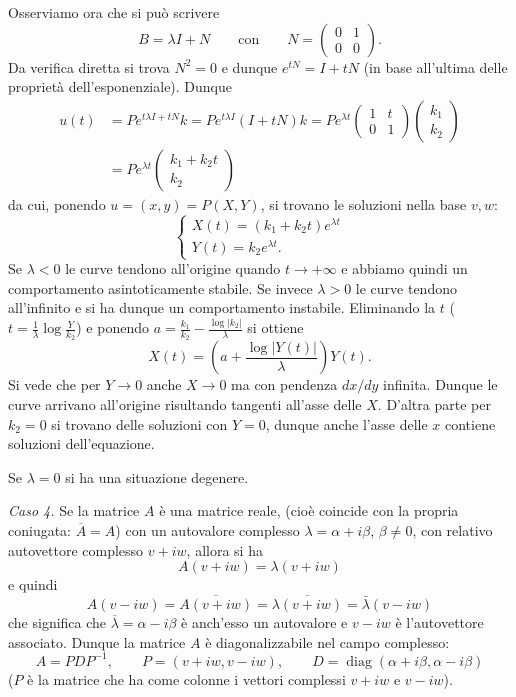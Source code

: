 \documentclass[italian,a4paper]{scrartcl}
\DeclareMathOperator{\diag}{diag}
\begin{document}
Osserviamo ora che si può scrivere
\[
B = \lambda I + N \qquad\text{con}\qquad N=\begin{pmatrix}0&1\\0 & 0\end{pmatrix}.
\]
Da verifica diretta si trova $N^2=0$ e dunque $e^{tN} = I + tN$ (in base
all'ultima delle proprietà dell'esponenziale). Dunque
\begin{align*}
u(t) &= P e^{t\lambda I + tN}k = P e^{t\lambda I} (I + t N)k =
P e^{\lambda t} \begin{pmatrix} 1 & t \\ 0 & 1\end{pmatrix}\begin{pmatrix}k_1\\k_2\end{pmatrix}\\
& = P e^{\lambda t}\begin{pmatrix}k_1 + k_2 t \\ k_2\end{pmatrix}
\end{align*}
da cui, ponendo $u=(x,y) = P(X,Y)$, si trovano le soluzioni nella base
$v,w$:
\[
\begin{cases}
X(t) = (k_1 + k_2 t) e^{\lambda t}\\
Y(t) = k_2 e^{\lambda t}.
\end{cases}
\]
Se $\lambda<0$ le curve tendono all'origine quando $t\to +\infty$ e
abbiamo quindi un comportamento asintoticamente stabile. Se invece
$\lambda>0$ le curve tendono all'infinito e si ha dunque un
comportamento instabile.
Eliminando la $t$ ($t=\frac 1 \lambda \log\frac Y {k_2}$) e ponendo $a
= \frac{k_1}{k_2} - \frac{\log|k_2|}{\lambda}$ si ottiene
\[
X(t) = \left(a+\frac{\log|Y(t)|}{\lambda}\right)Y(t).
\]
Si vede che per $Y\to 0$ anche $X\to 0$ ma con pendenza $dx/dy$
infinita. Dunque le curve arrivano all'origine risultando tangenti
all'asse delle $X$. D'altra parte per $k_2=0$ si trovano delle
soluzioni con $Y=0$, dunque anche l'asse delle $x$ contiene soluzioni
dell'equazione.

Se $\lambda=0$ si ha una situazione degenere.

\emph{Caso 4.}
Se la matrice $A$ è una matrice reale, (cioè coincide con la propria
coniugata: $\overline A=A$) con un autovalore complesso $\lambda =
\alpha + i\beta$, $\beta\neq 0$, con relativo autovettore complesso
$v+iw$, allora si ha
\[
  A(v+iw) = \lambda(v+iw)
\]
e quindi
\[
  A(v-iw) = \overline{A(v+iw)} = \overline{\lambda(v+iw)} = \bar \lambda (v-iw)
\]
che significa che $\overline \lambda = \alpha-i\beta$ è anch'esso un autovalore e $v-iw$ è l'autovettore associato. Dunque la matrice $A$ è diagonalizzabile nel campo complesso:
\[
  A = P D P^{-1},\qquad P=(v+iw, v-iw),\qquad D = \diag(\alpha+i\beta, \alpha-i\beta)
\]
($P$ è la matrice che ha come colonne i vettori complessi $v+iw$ e
$v-iw$).
\end{document}
